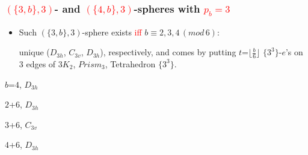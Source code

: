 \documentclass{beamer}
\begin{document}
\begin{frame}\frametitle{\textcolor{red}{$(\{3,b\},3)$}- and 
\textcolor{red}{$(\{4,b\},3)$}-spheres with \textcolor{red}{$p_b=3$}}
\vspace{-3mm}

\begin{itemize}
\item
Such $(\{3,b\},3)$-sphere  exists \textcolor{red}{iff} $b\equiv 2,3,4\,(mod\,6)$:

unique  ($D_{3h}$, $C_{3v}$, $D_{3h}$), respectively,  and
comes  by putting $t$=$\lfloor{\frac{b}{6}}\rfloor$  $\{3^3\}$-$e$'s on $3$ edges of 
$3K_2$, $Prism_3$,  Tetrahedron $\{3^3\}$.
\end{itemize}


\begin{center}
\begin{minipage}[b]{19mm}
\centering
{}\par
$b$=$4$, $D_{3h}$
\end{minipage}
\begin{minipage}[b]{19mm}
\centering
{}\par 
$2$+$6$, $D_{3h}$
\end{minipage}  
\begin{minipage}[b]{19mm}
\centering
{}\par 
$3$+$6$, $C_{3v}$
\end{minipage}
\begin{minipage}[b]{19mm}
\centering
{}\par 
$4$+$6$, $D_{3h}$
\end{minipage}
\end{center}
\vspace{-4mm}



\end{frame}
\end{document}
